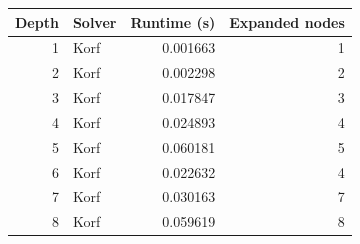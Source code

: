 \begin{tabular}{rp{}rr}
\hline
Depth & Solver & Runtime (s) & Expanded nodes \\
\hline
1 & Korf & 0.001663 & 1 \\
2 & Korf & 0.002298 & 2 \\
3 & Korf & 0.017847 & 3 \\
4 & Korf & 0.024893 & 4 \\
5 & Korf & 0.060181 & 5 \\
6 & Korf & 0.022632 & 4 \\
7 & Korf & 0.030163 & 7 \\
8 & Korf & 0.059619 & 8 \\
\hline
\end{tabular}
